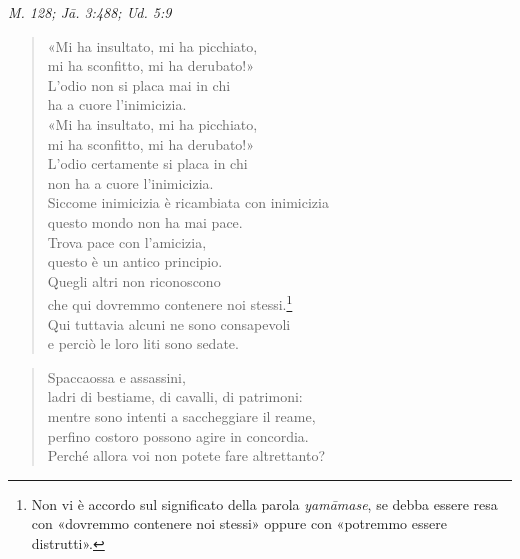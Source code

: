 \emph{M. 128; Jā. 3:488; Ud. 5:9} \\


\begin{quote}
«Mi ha insultato, mi ha picchiato, \\
mi ha sconfitto, mi ha derubato!» \\
L’odio non si placa mai in chi \\
ha a cuore l’inimicizia. \\
«Mi ha insultato, mi ha picchiato, \\
mi ha sconfitto, mi ha derubato!» \\
L’odio certamente si placa in chi \\
non ha a cuore l’inimicizia. \\
Siccome inimicizia è ricambiata con inimicizia \\
questo mondo non ha mai pace. \\
Trova pace con l’amicizia, \\
questo è un antico principio. \\
Quegli altri non riconoscono \\
che qui dovremmo contenere noi stessi.\footnote{Non vi è accordo sul significato della parola \emph{yamāmase}, se debba essere resa con «dovremmo contenere noi stessi» oppure con «potremmo essere distrutti».} \\
Qui tuttavia alcuni ne sono consapevoli \\
e perciò le loro liti sono sedate.
\end{quote}



\begin{quote}
Spaccaossa e assassini, \\
ladri di bestiame, di cavalli, di patrimoni: \\
mentre sono intenti a saccheggiare il reame, \\
perfino costoro possono agire in concordia. \\
Perché allora voi non potete fare altrettanto?
\end{quote}




